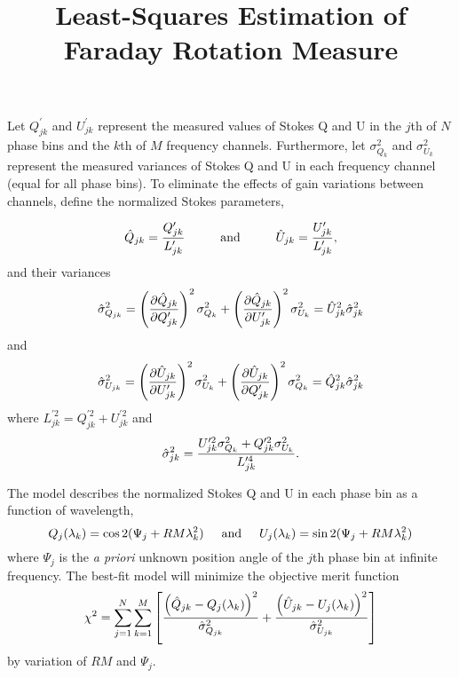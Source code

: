 \documentclass[12pt]{article}
\title{Least-Squares Estimation of Faraday Rotation Measure}
\begin{document}
Let $Q^\prime_{jk}$ and $U^\prime_{jk}$ represent the measured values
of Stokes Q and U in the $j$th of $N$ phase bins and the $k$th of $M$
frequency channels.  Furthermore, let $\sigma^2_{Q_k}$ and
$\sigma^2_{U_k}$ represent the measured variances of Stokes Q and U in
each frequency channel (equal for all phase bins).  To eliminate the
effects of gain variations between channels, define the normalized
Stokes parameters,

\begin{equation}
\hat{Q}_{jk} = { Q^\prime_{jk} \over L^\prime_{jk} }
\hspace{1cm} {\rm and} \hspace{1cm}
\hat{U}_{jk} = { U^\prime_{jk} \over L^\prime_{jk} },
\end{equation}
and their variances
\begin{equation}
\hat{\sigma}^2_{Q_{jk}}
=\left({\partial\hat{Q}_{jk}\over\partial Q^\prime_{jk}}\right)^2\sigma^2_{Q_k}
+\left({\partial\hat{Q}_{jk}\over\partial U^\prime_{jk}}\right)^2\sigma^2_{U_k}
=\hat{U}^2_{jk}\hat{\sigma}^2_{jk}
\end{equation}
and
\begin{equation}
\hat{\sigma}^2_{U_{jk}}
=\left({\partial\hat{U}_{jk}\over\partial U^\prime_{jk}}\right)^2\sigma^2_{U_k}
+\left({\partial\hat{U}_{jk}\over\partial Q^\prime_{jk}}\right)^2\sigma^2_{Q_k}
=\hat{Q}^2_{jk}\hat{\sigma}^2_{jk}
\end{equation}
where $L^{\prime2}_{jk} = Q^{\prime2}_{jk} + U^{\prime2}_{jk}$ and
\begin{equation}
\hat{\sigma}^2_{jk} =
{ U^{\prime2}_{jk}\sigma^2_{Q_k}+Q^{\prime2}_{jk}\sigma^2_{U_k}
 \over L^{\prime4}_{jk} }.
\end{equation}

The model describes the normalized Stokes Q and U in each phase
bin as a function of wavelength,
\begin{equation}
Q_j(\lambda_k) = \cos 2(\Psi_j + RM \lambda^2_k)
\hspace{5mm} {\rm and} \hspace{5mm}
U_j(\lambda_k) = \sin 2(\Psi_j + RM \lambda^2_k)
\end{equation}
where $\Psi_j$ is the {\it a priori} unknown position angle of the $j$th
phase bin at infinite frequency.  The best-fit model will minimize the
objective merit function
\begin{equation}
\chi^2 = \sum_{j=1}^N \sum_{k=1}^M \left[
{\left(\hat{Q}_{jk} - Q_j(\lambda_k)\right)^2 \over \hat{\sigma}^2_{Q_{jk}}} +
{\left(\hat{U}_{jk} - U_j(\lambda_k)\right)^2 \over \hat{\sigma}^2_{U_{jk}}}
\right]
\end{equation}
by variation of $RM$ and $\Psi_j$.
\end{document}
